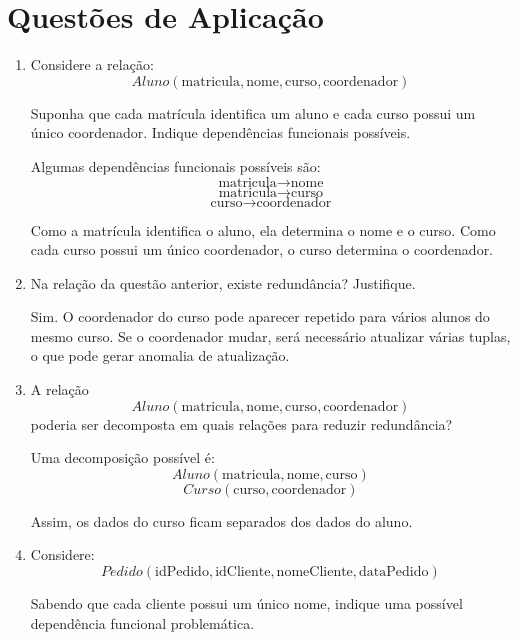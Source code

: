 \documentclass[12pt,a4paper]{article}
\begin{document}
\section{Questões de Aplicação}

\begin{enumerate}[resume,label=\textbf{Q\arabic*.}]

\item Considere a relação:
\[
Aluno(\text{matricula}, \text{nome}, \text{curso}, \text{coordenador})
\]

Suponha que cada matrícula identifica um aluno e cada curso possui um único coordenador. Indique dependências funcionais possíveis.

\begin{resposta}
Algumas dependências funcionais possíveis são:
\[
\text{matricula} \rightarrow \text{nome}
\]
\[
\text{matricula} \rightarrow \text{curso}
\]
\[
\text{curso} \rightarrow \text{coordenador}
\]

Como a matrícula identifica o aluno, ela determina o nome e o curso. Como cada curso possui um único coordenador, o curso determina o coordenador.
\end{resposta}

\item Na relação da questão anterior, existe redundância? Justifique.

\begin{resposta}
Sim. O coordenador do curso pode aparecer repetido para vários alunos do mesmo curso. Se o coordenador mudar, será necessário atualizar várias tuplas, o que pode gerar anomalia de atualização.
\end{resposta}

\item A relação
\[
Aluno(\text{matricula}, \text{nome}, \text{curso}, \text{coordenador})
\]
poderia ser decomposta em quais relações para reduzir redundância?

\begin{resposta}
Uma decomposição possível é:
\[
Aluno(\text{matricula}, \text{nome}, \text{curso})
\]
\[
Curso(\text{curso}, \text{coordenador})
\]

Assim, os dados do curso ficam separados dos dados do aluno.
\end{resposta}

\item Considere:
\[
Pedido(\text{idPedido}, \text{idCliente}, \text{nomeCliente}, \text{dataPedido})
\]

Sabendo que cada cliente possui um único nome, indique uma possível dependência funcional problemática.


\end{enumerate}
\end{document}
